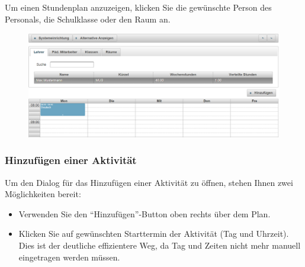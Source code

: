 \documentclass[fontsize=12pt]{scrartcl}
\begin{document}
Um einen Stundenplan anzuzeigen, klicken Sie die gewünschte Person des Personals, die Schulklasse oder den Raum an.

\begin{figure}[H]
\centering
\includegraphics[width=\textwidth]{images/planningPage2.png}
\end{figure}

\subsubsection{Hinzufügen einer Aktivität}
Um den Dialog für das Hinzufügen einer Aktivität zu öffnen, stehen Ihnen zwei Möglichkeiten bereit: 
\begin{itemize}
\item Verwenden Sie den "`Hinzufügen"'-Button oben rechts über dem Plan.
\item Klicken Sie auf gewünschten Starttermin der Aktivität (Tag und Uhrzeit). Dies ist der deutliche effizientere Weg, da Tag und Zeiten nicht mehr manuell eingetragen werden müssen.
\end{itemize}
\end{document}
